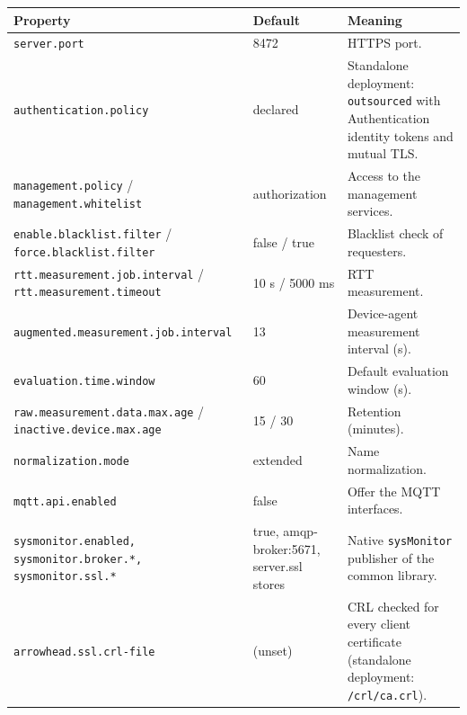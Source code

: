 \documentclass[a4paper]{arrowhead}
\begin{document}
\noindent\begin{longtable}{| p{5.4cm} | p{3.4cm} | p{6.4cm} |} \hline
\rowcolor{gray!33} Property & Default & Meaning \\ \hline \endhead
\texttt{server.\allowbreak{}port} & 8472 & HTTPS port. \\ \hline
\texttt{authentication.\allowbreak{}policy} & declared & Standalone deployment: \texttt{outsourced} with Authentication identity tokens and mutual TLS. \\ \hline
\texttt{management.\allowbreak{}policy} / \texttt{management.\allowbreak{}whitelist} & authorization & Access to the management services. \\ \hline
\texttt{enable.\allowbreak{}blacklist.\allowbreak{}filter} / \texttt{force.\allowbreak{}blacklist.\allowbreak{}filter} & false / true & Blacklist check of requesters. \\ \hline
\texttt{rtt.\allowbreak{}measurement.\allowbreak{}job.\allowbreak{}interval} / \texttt{rtt.\allowbreak{}measurement.\allowbreak{}timeout} & 10 s / 5000 ms & RTT measurement. \\ \hline
\texttt{augmented.\allowbreak{}measurement.\allowbreak{}job.\allowbreak{}interval} & 13 & Device-agent measurement interval (s). \\ \hline
\texttt{evaluation.\allowbreak{}time.\allowbreak{}window} & 60 & Default evaluation window (s). \\ \hline
\texttt{raw.\allowbreak{}measurement.\allowbreak{}data.\allowbreak{}max.\allowbreak{}age} / \texttt{inactive.\allowbreak{}device.\allowbreak{}max.\allowbreak{}age} & 15 / 30 & Retention (minutes). \\ \hline
\texttt{normalization.\allowbreak{}mode} & extended & Name normalization. \\ \hline
\texttt{mqtt.\allowbreak{}api.\allowbreak{}enabled} & false & Offer the MQTT interfaces. \\ \hline
\texttt{sysmonitor.\allowbreak{}enabled,\allowbreak{} sysmonitor.\allowbreak{}broker.\allowbreak{}*,\allowbreak{} sysmonitor.\allowbreak{}ssl.\allowbreak{}*} & true, amqp-broker:5671, server.ssl stores & Native \texttt{sysMonitor} publisher of the common library. \\ \hline
\texttt{arrowhead.\allowbreak{}ssl.\allowbreak{}crl-\allowbreak{}file} & (unset) & CRL checked for every client certificate (standalone deployment: \texttt{/\allowbreak{}crl/\allowbreak{}ca.\allowbreak{}crl}). \\ \hline
\end{longtable}
\end{document}

